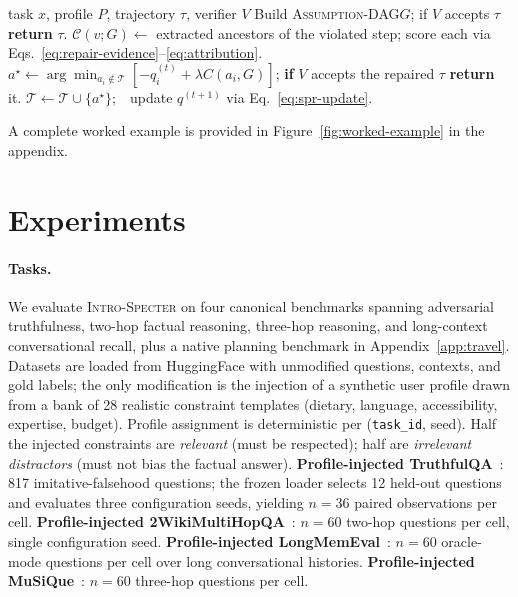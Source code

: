 \documentclass{article}
\newcommand{\method}{\textsc{Intro-Specter}\xspace}
\newcommand{\dagg}{\textsc{Assumption-DAG}\xspace}
\begin{document}
\begin{algorithm}[H]
\caption{\method (sketch). Full pseudocode with caching, abstention, and SPR loop in Appendix~\ref{app:spr-impl}.}\label{alg:intro-specter-mini}
\begin{algorithmic}[1]
  \Require task $x$, profile $P$, trajectory $\tau$, verifier $V$
  \State Build \dagg $G$; if $V$ accepts $\tau$ \textbf{return} $\tau$.
  \State $\mathcal{C}(v;G) \gets$ extracted ancestors of the violated step; score each via Eqs.~\ref{eq:repair-evidence}--\ref{eq:attribution}.
    \State $a^\star \gets \arg\min_{a_i \notin \mathcal{T}} [-q^{(t)}_i + \lambda C(a_i, G)]$; \textbf{if} $V$ accepts the repaired $\tau$ \textbf{return} it.
    \State $\mathcal{T} \gets \mathcal{T} \cup \{a^\star\}$;\ \ update $q^{(t+1)}$ via Eq.~\ref{eq:spr-update}.
  \EndFor
\end{algorithmic}\end{algorithm}

A complete worked example is provided in Figure~\ref{fig:worked-example} in the appendix.

\section{Experiments}\label{sec:experiments}

\paragraph{Tasks.} We evaluate \method on four canonical benchmarks spanning adversarial truthfulness, two-hop factual reasoning, three-hop reasoning, and long-context conversational recall, plus a native planning benchmark in Appendix~\ref{app:travel}. Datasets are loaded from HuggingFace with unmodified questions, contexts, and gold labels; the only modification is the injection of a synthetic user profile drawn from a bank of 28 realistic constraint templates (dietary, language, accessibility, expertise, budget). Profile assignment is deterministic per (\texttt{task\_id}, seed). Half the injected constraints are \emph{relevant} (must be respected); half are \emph{irrelevant distractors} (must not bias the factual answer). \textbf{Profile-injected TruthfulQA}~\citep{lin2021truthfulqa}: 817 imitative-falsehood questions; the frozen loader selects 12 held-out questions and evaluates three configuration seeds, yielding $n{=}36$ paired observations per cell. \textbf{Profile-injected 2WikiMultiHopQA}~\citep{ho2020twowiki}: $n{=}60$ two-hop questions per cell, single configuration seed. \textbf{Profile-injected LongMemEval}~\citep{wu2024longmemeval}: $n{=}60$ oracle-mode questions per cell over long conversational histories. \textbf{Profile-injected MuSiQue}~\citep{trivedi2022musique}: $n{=}60$ three-hop questions per cell.
\end{document}
